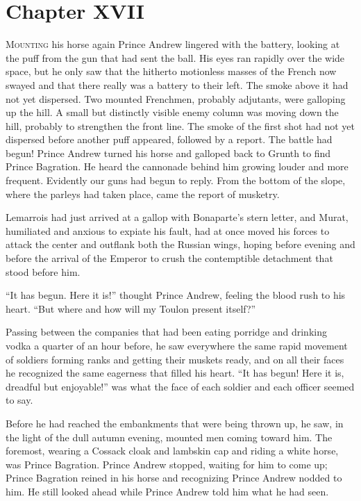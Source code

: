 \chapter*{Chapter XVII}
\ifaudio     {} \fi

\lettrine[lines=2, loversize=0.3, lraise=0]{\initfamily M}{ounting}
his horse again Prince Andrew lingered with the battery,
looking at the puff from the gun that had sent the ball. His eyes
ran rapidly over the wide space, but he only saw that the
hitherto motionless masses of the French now swayed and that
there really was a battery to their left. The smoke above it had
not yet dispersed. Two mounted Frenchmen, probably adjutants,
were galloping up the hill. A small but distinctly visible enemy
column was moving down the hill, probably to strengthen the front
line. The smoke of the first shot had not yet dispersed before
another puff appeared, followed by a report.  The battle had
begun! Prince Andrew turned his horse and galloped back to Grunth
to find Prince Bagration. He heard the cannonade behind him
growing louder and more frequent. Evidently our guns had begun to
reply.  From the bottom of the slope, where the parleys had taken
place, came the report of musketry.

Lemarrois had just arrived at a gallop with Bonaparte's stern
letter, and Murat, humiliated and anxious to expiate his fault,
had at once moved his forces to attack the center and outflank
both the Russian wings, hoping before evening and before the
arrival of the Emperor to crush the contemptible detachment that
stood before him.

``It has begun. Here it is!'' thought Prince Andrew, feeling the
blood rush to his heart. ``But where and how will my Toulon
present itself?''

Passing between the companies that had been eating porridge and
drinking vodka a quarter of an hour before, he saw everywhere the
same rapid movement of soldiers forming ranks and getting their
muskets ready, and on all their faces he recognized the same
eagerness that filled his heart. ``It has begun! Here it is,
dreadful but enjoyable!'' was what the face of each soldier and
each officer seemed to say.

Before he had reached the embankments that were being thrown up,
he saw, in the light of the dull autumn evening, mounted men
coming toward him.  The foremost, wearing a Cossack cloak and
lambskin cap and riding a white horse, was Prince
Bagration. Prince Andrew stopped, waiting for him to come up;
Prince Bagration reined in his horse and recognizing Prince
Andrew nodded to him. He still looked ahead while Prince Andrew
told him what he had seen.

